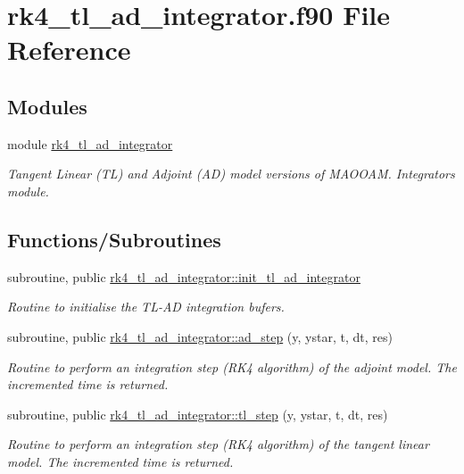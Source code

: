 \hypertarget{rk4__tl__ad__integrator_8f90}{}\section{rk4\+\_\+tl\+\_\+ad\+\_\+integrator.\+f90 File Reference}
\label{rk4__tl__ad__integrator_8f90}
\subsection*{Modules}
\begin{DoxyCompactItemize}
\item 
module \hyperlink{namespacerk4__tl__ad__integrator}{rk4\+\_\+tl\+\_\+ad\+\_\+integrator}
\begin{DoxyCompactList}\small\item\em Tangent Linear (TL) and Adjoint (AD) model versions of M\+A\+O\+O\+AM. Integrators module. \end{DoxyCompactList}\end{DoxyCompactItemize}
\subsection*{Functions/\+Subroutines}
\begin{DoxyCompactItemize}
\item 
subroutine, public \hyperlink{namespacerk4__tl__ad__integrator_aa219595db79d201625e347d3db633a6f}{rk4\+\_\+tl\+\_\+ad\+\_\+integrator\+::init\+\_\+tl\+\_\+ad\+\_\+integrator}
\begin{DoxyCompactList}\small\item\em Routine to initialise the T\+L-\/\+AD integration bufers. \end{DoxyCompactList}\item 
subroutine, public \hyperlink{namespacerk4__tl__ad__integrator_a72dadb6500707116e5864c89343dcae0}{rk4\+\_\+tl\+\_\+ad\+\_\+integrator\+::ad\+\_\+step} (y, ystar, t, dt, res)
\begin{DoxyCompactList}\small\item\em Routine to perform an integration step (R\+K4 algorithm) of the adjoint model. The incremented time is returned. \end{DoxyCompactList}\item 
subroutine, public \hyperlink{namespacerk4__tl__ad__integrator_a029c30f23bfe421a13788e75cc03b8d3}{rk4\+\_\+tl\+\_\+ad\+\_\+integrator\+::tl\+\_\+step} (y, ystar, t, dt, res)
\begin{DoxyCompactList}\small\item\em Routine to perform an integration step (R\+K4 algorithm) of the tangent linear model. The incremented time is returned. \end{DoxyCompactList}\end{DoxyCompactItemize}
